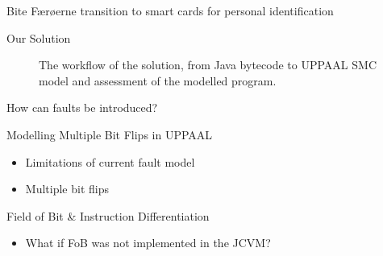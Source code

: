 


\begin{frame}[fragile]{Bite}
Færøerne transition to smart cards for personal identification
\end{frame}

\begin{frame}[fragile]{Our Solution}
\begin{figure}
\centering
\def\svgwidth{\columnwidth}

\caption{The workflow of the solution, from Java bytecode to UPPAAL SMC model and assessment of the modelled program.}
\label{fig:workflow_new}
\end{figure}
\end{frame}

\begin{frame}[fragile]{How can faults be introduced?}
\end{frame}

\begin{frame}[fragile]{Modelling Multiple Bit Flips in UPPAAL}
\begin{itemize}
\item Limitations of current fault model
\item Multiple bit flips	
\end{itemize}
\end{frame}

\begin{frame}[fragile]{Field of Bit \& Instruction Differentiation}
\begin{itemize}
\item What if FoB was not implemented in the JCVM?
\end{itemize}
\end{frame}